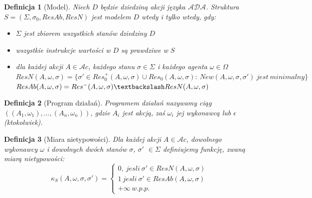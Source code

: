 \documentclass[11pt,a4paper]{article}
\newtheorem{definition}{Definicja}[section]
\begin{document}
    \begin{definition}[Model]
    Niech $D$ będzie dziedziną akcji języka $\mathcal{ADA}$. Struktura $S=(\Sigma, \sigma_0, ResAb, ResN)$ jest modelem $D$ wtedy i tylko wtedy, gdy:
    \begin{itemize}
        \item $\Sigma$ jest zbiorem wszystkich stanów dziedziny $D$
        \item wszystkie instrukcje wartości w $D$ są prawdziwe w $S$
        \item dla każdej akcji $A \in \mathcal{A}c$, każdego stanu $\sigma \in \Sigma$ i każdego agenta $\omega \in \Omega$
        \\$ResN(A,\omega,\sigma)=\{\sigma' \in Res_0^+(A,\omega,\sigma) \cup Res_0(A,\omega,\sigma):~ New(A,\omega,\sigma,\sigma')~jest~minimalny\}$
        \\$ResAb(A,\omega,\sigma)=Res^-(A,\omega,\sigma) \textbackslash ResN(A,\omega,\sigma)$
    \end{itemize}
    \end{definition}
    
    \begin{definition}[Program działań]
    Programem działań nazywamy ciąg $((A_1, \omega_1),...,(A_n,\omega_n))$, gdzie $A_i$ jest akcją, zaś $\omega_i$ jej wykonawcą lub $\epsilon$ (ktokolwiek). 
    \end{definition}
    
    \begin{definition}[Miara nietypowości]
    Dla każdej akcji $A \in \mathcal{A}c$, dowolnego wykonawcy $\omega$ i dowolnych dwóch stanów $\sigma$, $\sigma'$ $\in \Sigma$ definiujemy funkcję, zwaną miarą nietypowości: \\
    \[
    \kappa_S(A, \omega, \sigma, \sigma') = \left \{
        \begin{array}{ll}
             0,~jesli~\sigma' \in ResN(A, \omega, \sigma) \\
             1~jesli~\sigma' \in ResAb(A, \omega, \sigma) \\
             + \infty ~w.p.p.
         \end{array}
     \right.
    \]
    
    \end{definition}
    
\end{document}
